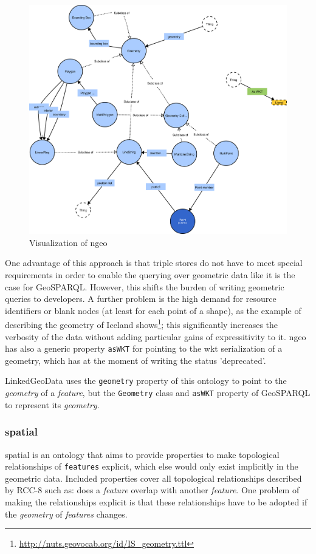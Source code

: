 \documentclass[draft,final]{vutinfth} %
\begin{document}
\begin{figure}[h]
    \centering
    \includegraphics[width=1.0\textwidth]{graphics/vocabularies/geom.png}
    \caption{Visualization of \gls{ngeo}}
    \label{fig:related-work-geospatial-ontologies:ngeo}
\end{figure}

One advantage of this approach is that triple stores do not have to meet special requirements in order to enable the querying over geometric data like it is the case for GeoSPARQL. However, this shifts the burden of writing geometric queries to developers. A further problem is the high demand for resource identifiers or blank nodes (at least for each point of a shape), as the example of describing the geometry of Iceland shows\footnote{\url{http://nuts.geovocab.org/id/IS_geometry.ttl}}; this significantly increases the verbosity of the data without adding particular gains of expressitivity to it\cite{battle_geosparql:_2011}. \gls{ngeo} has also a generic property \texttt{asWKT} for pointing to the \gls{wkt} serialization of a geometry, which has at the moment of writing the status 'deprecated'.

LinkedGeoData uses the \texttt{geometry} property of this ontology to point to the \textit{geometry} of a \textit{feature}, but the \texttt{Geometry} class and \texttt{asWKT} property of GeoSPARQL to represent its \textit{geometry}.

\subsubsection{\gls{spatial}}
\gls{spatial} is an ontology that aims to provide properties to make topological relationships of \texttt{features} explicit, which else would only exist implicitly in the geometric data. Included properties cover all topological relationships described by RCC-8 such as: does a \textit{feature} overlap with another \textit{feature}. One problem of making the relationships explicit is that these relationships have to be adopted if the \textit{geometry} of \textit{features} changes.
\end{document}
